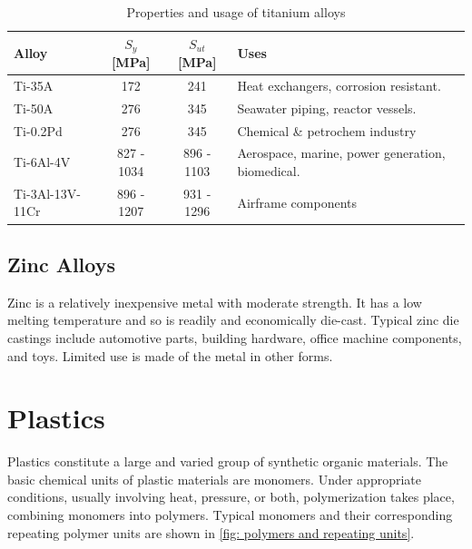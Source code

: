 \documentclass[
10pt,
a4paper,
openany,
svgnames,
]{book}
\begin{document}
\begin{table}[H]
  \centering
  \caption{Properties and usage of titanium alloys}
  \label{tab: prop and uses of ti alloys}
  \begin{tabular}{lccl}
    \toprule
    Alloy & $S_y$ [MPa] & $S_{ut}$ [MPa] & Uses \\
    \midrule
    Ti-35A & 172 & 241 & Heat exchangers, corrosion resistant.   \\
    Ti-50A & 276 & 345 & Seawater piping, reactor vessels.   \\
    Ti-0.2Pd & 276 & 345 & Chemical \& petrochem industry \\
    Ti-6Al-4V & 827 - 1034 & 896 - 1103 & Aerospace, marine, power generation, biomedical. \\
    Ti-3Al-13V-11Cr & 896 - 1207 & 931 - 1296 & Airframe components \\
    \bottomrule
  \end{tabular}
\end{table}

\subsection{Zinc Alloys}

Zinc is a relatively inexpensive metal with moderate strength. It has a low melting temperature and so is readily and economically die-cast. Typical zinc die castings include automotive parts, building hardware, office machine components, and toys. Limited use is made of the metal in other forms.

\section{Plastics}

Plastics constitute a large and varied group of synthetic organic materials. The basic chemical units of plastic materials are monomers. Under appropriate conditions, usually involving heat, pressure, or both, polymerization takes place, combining monomers into polymers. Typical monomers and their corresponding repeating polymer units are shown in \cref{fig: polymers and repeating units}.
\end{document}
